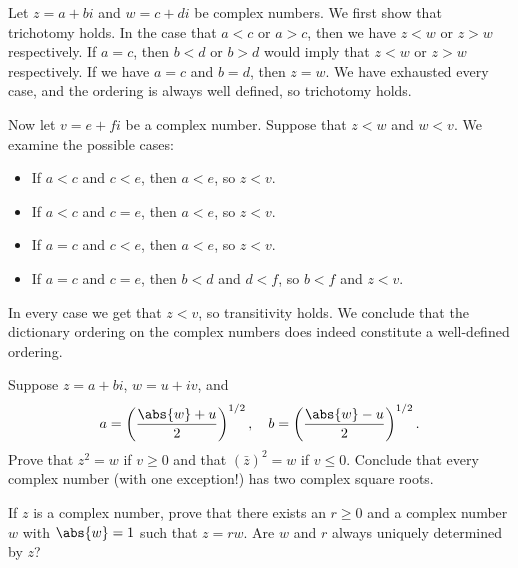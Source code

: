 \documentclass{zupan}
\begin{document}
\begin{solution}
  Let $z = a + bi$ and $w = c + di$ be complex numbers. We first show that
  trichotomy holds. In the case that $a < c$ or $a > c$, then we have $z < w$
  or $z > w$ respectively. If $a = c$, then $b < d$ or $b > d$ would imply that
  $z < w$ or $z > w$ respectively. If we have $a = c$ and $b = d$, then $z =
  w$. We have exhausted every case, and the ordering is always well defined, so
  trichotomy holds.

  Now let $v = e + fi$ be a complex number. Suppose that $z < w$ and $w < v$.
  We examine the possible cases:

  \begin{itemize}[noitemsep]
    \item If $a < c$ and $c < e$, then $a < e$, so $z < v$.
    \item If $a < c$ and $c = e$, then $a < e$, so $z < v$.
    \item If $a = c$ and $c < e$, then $a < e$, so $z < v$.
    \item If $a = c$ and $c = e$, then $b < d$ and $d < f$, so $b < f$ and $z < v$.
  \end{itemize}

  In every case we get that $z < v$, so transitivity holds. We conclude that
  the dictionary ordering on the complex numbers does indeed constitute a
  well-defined ordering.
\end{solution}

\begin{exercise}{10}
  Suppose $z = a + bi$, $w = u + iv$, and \[a = \left(\frac{\abs{w} + u}{2}
  \right)^{1/2}, \quad b = \left(\frac{\abs{w} - u}{2}\right)^{1/2}.\] Prove
  that $z^2 = w$ if $v \geq 0$ and that $(\bar{z})^2 = w$ if $v \leq 0$.
  Conclude that every complex number (with one exception!) has two complex
  square roots.
\end{exercise}

\begin{exercise}{11}
  If $z$ is a complex number, prove that there exists an $r \geq 0$ and a
  complex number $w$ with $\abs{w} = 1$ such that $z = rw$. Are $w$ and $r$
  always uniquely determined by $z$?
\end{exercise}
\end{document}
